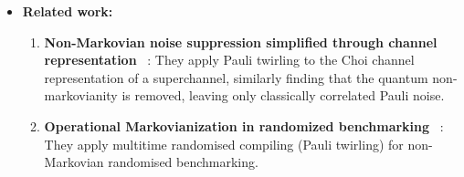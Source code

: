 {\begin{itemize}
\begin{enumerate}
        \item \textbf{Scalability.} While tensor networks are effective at making certain complex calculations tractable, there are limits to their ability to represent high dimensional, highly correlated data. In particular, combining spatial and temporal noise data generates a two-dimensional tensor network, whose contraction is not easy in general.
    \end{enumerate}
    \item \textbf{Related work:}
    \begin{enumerate}
        \item \textbf{Non-Markovian noise suppression simplified through channel representation} ~\cite{liunonmarkovian2024}: They apply Pauli twirling to the Choi channel representation of a superchannel, similarly finding that the quantum non-markovianity is removed, leaving only classically correlated Pauli noise.
        \item \textbf{Operational Markovianization in randomized benchmarking} ~\cite{figueroa-romerooperational2024}: They apply multitime randomised compiling (Pauli twirling) for non-Markovian randomised benchmarking.
    \end{enumerate}
\end{itemize}}